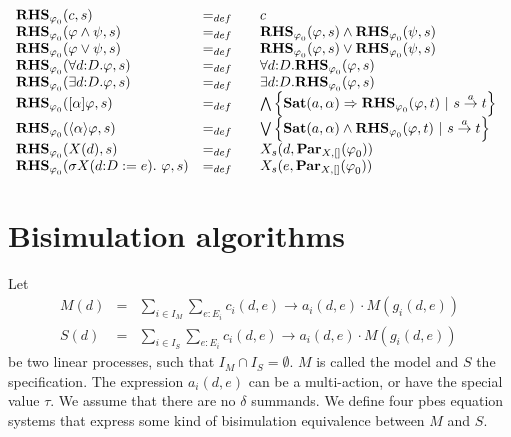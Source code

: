 \documentclass{article}
\begin{document}
$%
\begin{array}{lll}
{\mathbf{RHS}}_{\varphi _{0}}(c,s) & =_{def} & c \\ 
{\mathbf{RHS}}_{\varphi _{0}}(\varphi \wedge \psi ,s) & =_{def} & {\mathbf{%
RHS}}_{\varphi _{0}}(\varphi ,s)\wedge {\mathbf{RHS}}_{\varphi _{0}}(\psi ,s)
\\ 
{\mathbf{RHS}}_{\varphi _{0}}(\varphi \vee \psi ,s) & =_{def} & {\mathbf{RHS}%
}_{\varphi _{0}}(\varphi ,s)\vee {\mathbf{RHS}}_{\varphi _{0}}(\psi ,s) \\ 
{\mathbf{RHS}}_{\varphi _{0}}(\forall d{{:}D}.\varphi ,s) & =_{def} & 
\forall d{{:}D}.{\mathbf{RHS}}_{\varphi _{0}}(\varphi ,s) \\ 
{\mathbf{RHS}}_{\varphi _{0}}(\exists d{{:}D}.\varphi ,s) & =_{def} & 
\exists d{{:}D}.{\mathbf{RHS}}_{\varphi _{0}}(\varphi ,s) \\ 
{\mathbf{RHS}}_{\varphi _{0}}([\alpha ]\varphi ,s) & =_{def} & \bigwedge
\left\{ \mathbf{Sat}(a,\alpha )\Rightarrow {\mathbf{RHS}}_{\varphi
_{0}}(\varphi ,t)\ |\ s\overset{a}{\rightarrow }t\right\} \\ 
{\mathbf{RHS}}_{\varphi _{0}}(\langle \alpha \rangle \varphi ,s) & =_{def} & 
\bigvee \left\{ \mathbf{Sat}(a,\alpha )\wedge {\mathbf{RHS}}_{\varphi
_{0}}(\varphi ,t)\ |\ s\overset{a}{\rightarrow }t\right\} \\ 
{\mathbf{RHS}}_{\varphi _{0}}(X(d),s) & =_{def} & X_{s}(d,\mathbf{Par}%
_{X,[]}(\varphi _{0})) \\ 
{\mathbf{RHS}}_{\varphi _{0}}(\sigma X(d{:}D:=e).~\varphi ,s) & =_{def}~~~ & 
X_{s}(e,\mathbf{Par}_{X,[]}(\varphi _{0}))%
\end{array}%
$\pagebreak

\section{Bisimulation algorithms}

Let%
\begin{eqnarray*}
M(d) &=&\sum\limits_{i\in I_{M}}\sum_{e:E_{i}}c_{i}(d,e)\rightarrow
a_{i}(d,e)\cdot M(g_{i}(d,e)) \\
S(d) &=&\sum\limits_{i\in I_{S}}\sum_{e:E_{i}}c_{i}(d,e)\rightarrow
a_{i}(d,e)\cdot M(g_{i}(d,e))
\end{eqnarray*}%
be two linear processes, such that $I_{M}\cap I_{S}=\emptyset $. $M$ is
called the model and $S$ the specification. The expression $a_{i}(d,e)$ can
be a multi-action, or have the special value $\tau $. We assume that there
are no $\delta $ summands. We define four pbes equation systems that express
some kind of bisimulation equivalence between $M$ and $S$.
\end{document}
